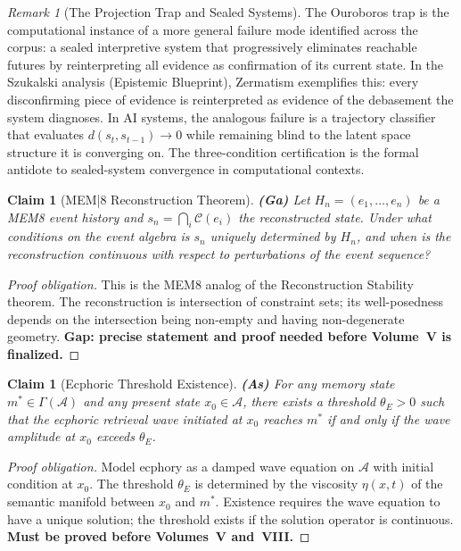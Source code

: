 \documentclass[11pt, a4paper]{book}
\theoremstyle{flyxion}
\newtheorem{claim}[theorem]{Claim}
\theoremstyle{remark}
\newtheorem{remark}[theorem]{Remark}
\begin{document}
\begin{remark}[The Projection Trap and Sealed Systems]
The Ouroboros trap is the computational instance of a more general
failure mode identified across the corpus: a sealed interpretive
system that progressively eliminates reachable futures by
reinterpreting all evidence as confirmation of its current state.
In the Szukalski analysis (Epistemic Blueprint), Zermatism
exemplifies this: every disconfirming piece of evidence is
reinterpreted as evidence of the debasement the system diagnoses.
In AI systems, the analogous failure is a trajectory classifier
that evaluates $d(s_t, s_{t-1}) \to 0$ while remaining blind to
the latent space structure it is converging on. The three-condition
certification is the formal antidote to sealed-system convergence
in computational contexts.
\end{remark}

\begin{claim}[MEM|8 Reconstruction Theorem] \textbf{(Ga)}
Let $H_n = (e_1,\ldots,e_n)$ be a MEM\textbar{}8 event history
and $s_n = \bigcap_i \mathcal{C}(e_i)$ the reconstructed state.
Under what conditions on the event algebra is $s_n$ uniquely
determined by $H_n$, and when is the reconstruction continuous
with respect to perturbations of the event sequence?
\end{claim}
\begin{proof}[Proof obligation]
This is the MEM\textbar{}8 analog of the Reconstruction Stability
theorem. The reconstruction is intersection of constraint sets; its
well-posedness depends on the intersection being non-empty and
having non-degenerate geometry. \textbf{Gap: precise statement and
proof needed before Volume~V is finalized.}
\end{proof}

\begin{claim}[Ecphoric Threshold Existence] \textbf{(As)}
For any memory state $m^* \in \Gamma(\mathcal{A})$ and any present
state $x_0 \in \mathcal{A}$, there exists a threshold $\theta_E > 0$
such that the ecphoric retrieval wave initiated at $x_0$ reaches
$m^*$ if and only if the wave amplitude at $x_0$ exceeds $\theta_E$.
\end{claim}
\begin{proof}[Proof obligation]
Model ecphory as a damped wave equation on $\mathcal{A}$ with
initial condition at $x_0$. The threshold $\theta_E$ is determined
by the viscosity $\eta(x,t)$ of the semantic manifold between $x_0$
and $m^*$. Existence requires the wave equation to have a unique
solution; the threshold exists if the solution operator is continuous.
\textbf{Must be proved before Volumes~V and~VIII.}
\end{proof}
\end{document}
